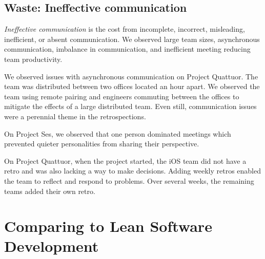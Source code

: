\subsection{Waste: Ineffective communication}
\textit{Ineffective communication} is the cost from incomplete, incorrect, misleading, inefficient, or absent communication. We observed large team sizes, asynchronous communication, imbalance in communication, and inefficient meeting reducing team productivity.

We observed issues with asynchronous communication on Project Quattuor. The team was distributed between two offices located an hour apart. We observed the team using remote pairing and engineers commuting between the offices to mitigate the effects of a large distributed team. Even still, communication issues were a perennial theme in the retrospections.


On Project Ses, we observed that one person dominated meetings which prevented quieter personalities from sharing their perspective. 

On Project Quattuor, when the project started, the iOS team did not have a retro and was also lacking a way to make decisions. Adding weekly retros enabled the team to reflect and respond to problems. Over several weeks, the remaining teams added their own retro. 






\section{Comparing to Lean Software Development}
\label{LeanSoftwareDevelopmentComarison}

